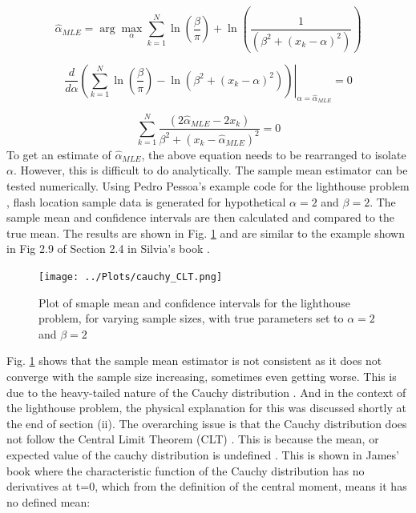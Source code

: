\documentclass[12pt]{report} %
\begin{document}
\begin{equation}
    \hat{\alpha}_{MLE} = \arg \max_{\alpha} \sum_{k=1}^{N} \ln(\frac{\beta}{\pi}) + \ln(\frac{1}{(\beta^{2} + (x_{k} - \alpha)^{2})})
\end{equation}

\begin{equation}
    \left. \frac{d}{d\alpha} \left( \sum_{k=1}^{N} \ln(\frac{\beta}{\pi}) - \ln(\beta^{2} + (x_{k} - \alpha)^{2}) \right) \right|_{\alpha = \hat{\alpha}_{MLE}} = 0
\end{equation}

\begin{equation}
    \sum_{k=1}^{N} \frac{(2\hat{\alpha}_{MLE} - 2x_{k})}{\beta^{2} + (x_{k} - \hat{\alpha}_{MLE})^{2}} = 0
\end{equation}
\newline
To get an estimate of $\hat{\alpha}_{MLE}$, the above equation needs to be rearranged to isolate $\alpha$. However, this is difficult to do analytically. The sample mean estimator can be tested numerically\cite[p. 32]{sivia_data_analysis}. Using Pedro Pessoa's example code for the lighthouse problem \cite{pessoa_lighthouse}, flash location sample data is generated for hypothetical $\alpha = 2$ and $\beta = 2$. The sample mean and confidence intervals are then calculated and compared to the true mean. The results are shown in Fig. \ref{fig:sample_mean} and are similar to the example shown in Fig 2.9 of Section 2.4 in Silvia's book \cite{sivia_data_analysis}.

\begin{figure}[h]
\centering
\texttt{[image: ../Plots/cauchy\_CLT.png]}
\caption{Plot of smaple mean and confidence intervals for the lighthouse problem, for varying sample sizes, with true parameters set to $\alpha = 2$ and $\beta = 2$}
\label{fig:sample_mean}
\end{figure}

Fig. \ref{fig:sample_mean} shows that the sample mean estimator is not consistent as it does not converge with the sample size increasing\cite[p.128]{FJames2006}, sometimes even getting worse. This is due to the heavy-tailed nature of the Cauchy distribution  \cite[p34]{sivia_data_analysis} \cite[p84]{FJames2006}. And in the context of the lighthouse problem, the physical explanation for this was discussed shortly at the end of section (ii). The overarching issue is that the Cauchy distribution does not follow the Central Limit Theorem (CLT) \cite[p34]{sivia_data_analysis}. This is because the mean, or expected value of the cauchy distribution is undefined \cite[p84]{FJames2006}. This is shown in James' book \cite[p34]{FJames2006} where the characteristic function of the Cauchy distribution has no derivatives at t=0, which from the definition of the central moment, means it has no defined mean:
\end{document}
